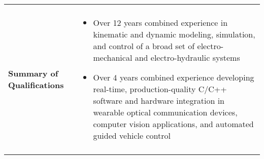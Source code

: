 \begin{tabular}{L{\lcolw}  L{\rcolw}}
 \hline \hline \\
\textbf{\Large Summary of Qualifications} &
\vspace{-0.3in} 
    \begin{itemize}[leftmargin = \itemmargin]

	\item Over 12 years combined experience in kinematic and dynamic modeling, simulation, and control of a broad set of electro-mechanical and electro-hydraulic systems
	
	\item Over 4 years combined experience developing real-time, production-quality C/C++ software and hardware integration in wearable optical communication devices, computer vision applications, and automated guided vehicle control
	
	\end{itemize}\\
 \hline \\ 
\end{tabular}
